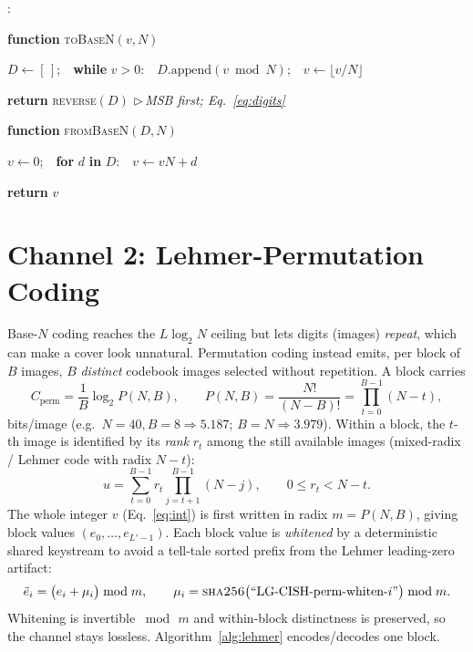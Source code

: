 \documentclass[11pt]{article}
\newcounter{algln}
\newenvironment{pseudo}{%
  \begin{list}{\footnotesize\arabic{algln}:}{%
    \usecounter{algln}%
    \setlength{\leftmargin}{2.4em}\setlength{\labelwidth}{1.7em}%
    \setlength{\labelsep}{0.4em}\setlength{\itemsep}{1.5pt}%
    \setlength{\parsep}{0pt}\setlength{\topsep}{3pt}\small}%
}{\end{list}}
\newcommand{\kw}[1]{\textbf{#1}}
\newcommand{\Ind}{\hspace*{1.3em}}
\newcommand{\Cmt}[1]{\hfill{\footnotesize$\triangleright$\,\textit{#1}}}
\begin{document}
\begin{algorithm}[t]
\caption{Base-$N$ integer coding: \textsc{toBaseN} / \textsc{fromBaseN}}\label{alg:basen}
\begin{pseudo}
\item \kw{function} \textsc{toBaseN}$(v,N)$
\item \Ind $D\gets[\,]$;\ \ \kw{while} $v>0$:\ \ $D.\text{append}(v \bmod N)$;\ \ $v\gets\lfloor v/N\rfloor$
\item \Ind \kw{return} \textsc{reverse}$(D)$ \Cmt{MSB first; Eq.~\eqref{eq:digits}}
\item \kw{function} \textsc{fromBaseN}$(D,N)$
\item \Ind $v\gets 0$;\ \ \kw{for} $d$ \kw{in} $D$:\ \ $v\gets vN+d$
\item \Ind \kw{return} $v$
\end{pseudo}
\end{algorithm}

\section{Channel 2: Lehmer-Permutation Coding}
Base-$N$ coding reaches the $L\log_2 N$ ceiling but lets digits (images)
\emph{repeat}, which can make a cover look unnatural. Permutation coding instead
emits, per block of $B$ images, $B$ \emph{distinct} codebook images selected
without repetition. A block carries
\begin{equation}
  C_{\text{perm}}=\frac{1}{B}\log_2 P(N,B),\qquad
  P(N,B)=\frac{N!}{(N-B)!}=\prod_{t=0}^{B-1}(N-t),
  \label{eq:perm}
\end{equation}
bits/image (e.g.\ $N{=}40,B{=}8\Rightarrow5.187$; $B{=}N\Rightarrow3.979$). Within a
block, the $t$-th image is identified by its \emph{rank} $r_t$ among the still
available images (mixed-radix / Lehmer code with radix $N-t$):
\begin{equation}
  u=\sum_{t=0}^{B-1} r_t \!\!\prod_{j=t+1}^{B-1}\!\!(N-j),\qquad 0\le r_t<N-t .
  \label{eq:lehmer}
\end{equation}
The whole integer $v$ (Eq.~\eqref{eq:int}) is first written in radix
$m=P(N,B)$, giving block values $(e_0,\dots,e_{L'-1})$. Each block value is
\emph{whitened} by a deterministic shared keystream to avoid a tell-tale sorted
prefix from the Lehmer leading-zero artifact:
\begin{equation}
  \tilde e_i=\big(e_i+\mu_i\big)\bmod m,\qquad
  \mu_i=\textsc{sha256}\big(\text{``LG\text{-}CISH\text{-}perm\text{-}whiten\text{-}}i\text{''}\big)\bmod m .
  \label{eq:whiten}
\end{equation}
Whitening is invertible $\bmod\,m$ and within-block distinctness is preserved, so
the channel stays lossless. Algorithm~\ref{alg:lehmer} encodes/decodes one block.
\end{document}
